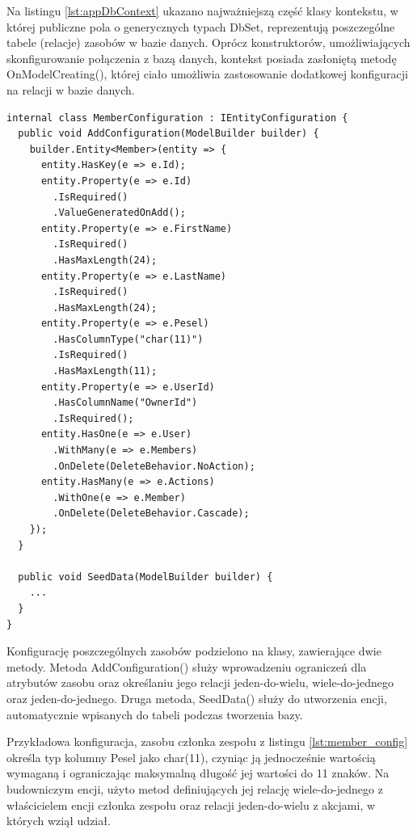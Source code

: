 Na listingu \ref{lst:appDbContext} ukazano najważniejszą część klasy kontekstu, w której publiczne pola o generycznych typach DbSet, reprezentują poszczególne tabele (relacje) zasobów w bazie danych. Oprócz konstruktorów, umożliwiających skonfigurowanie połączenia z bazą danych, kontekst posiada zasłoniętą metodę OnModelCreating(), której ciało umożliwia zastosowanie dodatkowej konfiguracji na relacji w bazie danych.

\begin{lstlisting}[language=CSharp, caption=Przykładowa klasa konfiguracyjna relacji w bazie danych wykorzystująca interfejs biegły Entity Framework Core, label=lst:member_config]
internal class MemberConfiguration : IEntityConfiguration {
  public void AddConfiguration(ModelBuilder builder) {
    builder.Entity<Member>(entity => {
      entity.HasKey(e => e.Id);
      entity.Property(e => e.Id)
        .IsRequired()
        .ValueGeneratedOnAdd();
      entity.Property(e => e.FirstName)
        .IsRequired()
        .HasMaxLength(24);
      entity.Property(e => e.LastName)
        .IsRequired()
        .HasMaxLength(24);
      entity.Property(e => e.Pesel)
        .HasColumnType("char(11)")
        .IsRequired()
        .HasMaxLength(11);
      entity.Property(e => e.UserId)
        .HasColumnName("OwnerId")
        .IsRequired();
      entity.HasOne(e => e.User)
        .WithMany(e => e.Members)
        .OnDelete(DeleteBehavior.NoAction);
      entity.HasMany(e => e.Actions)
        .WithOne(e => e.Member)
        .OnDelete(DeleteBehavior.Cascade);
    });
  }

  public void SeedData(ModelBuilder builder) {
    ...
  }
}
\end{lstlisting}

Konfigurację poszczególnych zasobów podzielono na klasy, zawierające dwie metody. Metoda AddConfiguration() służy wprowadzeniu ograniczeń dla atrybutów zasobu oraz określaniu jego relacji jeden-do-wielu, wiele-do-jednego oraz jeden-do-jednego. Druga metoda, SeedData() służy do utworzenia encji, automatycznie wpisanych do tabeli podczas tworzenia bazy.

Przykładowa konfiguracja, zasobu członka zespołu z listingu \ref{lst:member_config} określa typ kolumny Pesel jako char(11), czyniąc ją jednocześnie wartością wymaganą i ograniczając maksymalną długość jej wartości do 11 znaków. Na budowniczym encji, użyto metod definiujących jej relację wiele-do-jednego z właścicielem encji członka zespołu oraz relacji jeden-do-wielu z akcjami, w których wziął udział.

